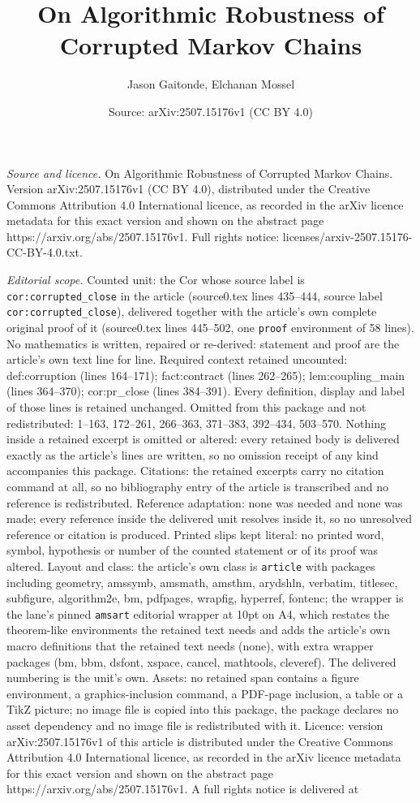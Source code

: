 \documentclass[10pt,a4paper]{amsart}
\title[On Algorithmic Robustness of Corrupted Markov Chains]{On Algorithmic Robustness of Corrupted Markov Chains}
\author{Jason Gaitonde, Elchanan Mossel}
\date{Source: arXiv:2507.15176v1 (CC BY 4.0)}
\begin{document}
\maketitle

\noindent\emph{Source and licence.} On Algorithmic Robustness of Corrupted Markov Chains. Version arXiv:2507.15176v1 (CC BY 4.0), distributed under the Creative Commons Attribution 4.0 International licence, as recorded in the arXiv licence metadata for this exact version and shown on the abstract page https://arxiv.org/abs/2507.15176v1. Full rights notice: licenses/arxiv-2507.15176-CC-BY-4.0.txt.\par\smallskip

\noindent\textit{Editorial scope.} Counted unit: the Cor whose source label is \texttt{cor:corrupted\_close} in the article (source0.tex lines 435--444, source label \texttt{cor:corrupted\_close}), delivered together with the article's own complete original proof of it (source0.tex lines 445--502, one \texttt{proof} environment of 58 lines). No mathematics is written, repaired or re-derived: statement and proof are the article's own text line for line. Required context retained uncounted: def:corruption (lines 164--171); fact:contract (lines 262--265); lem:coupling\_main (lines 364--370); cor:pr\_close (lines 384--391). Every definition, display and label of those lines is retained unchanged. Omitted from this package and not redistributed: 1--163, 172--261, 266--363, 371--383, 392--434, 503--570. Nothing inside a retained excerpt is omitted or altered: every retained body is delivered exactly as the article's lines are written, so no omission receipt of any kind accompanies this package. Citations: the retained excerpts carry no citation command at all, so no bibliography entry of the article is transcribed and no reference is redistributed. Reference adaptation: none was needed and none was made; every reference inside the delivered unit resolves inside it, so no unresolved reference or citation is produced. Printed slips kept literal: no printed word, symbol, hypothesis or number of the counted statement or of its proof was altered. Layout and class: the article's own class is \texttt{article} with packages including geometry, amssymb, amsmath, amsthm, arydshln, verbatim, titlesec, subfigure, algorithm2e, bm, pdfpages, wrapfig, hyperref, fontenc; the wrapper is the lane's pinned \texttt{amsart} editorial wrapper at 10pt on A4, which restates the theorem-like environments the retained text needs and adds the article's own macro definitions that the retained text needs (none), with extra wrapper packages (bm, bbm, dsfont, xspace, cancel, mathtools, cleveref). The delivered numbering is the unit's own. Assets: no retained span contains a figure environment, a graphics-inclusion command, a PDF-page inclusion, a table or a TikZ picture; no image file is copied into this package, the package declares no asset dependency and no image file is redistributed with it. Licence: version arXiv:2507.15176v1 of this article is distributed under the Creative Commons Attribution 4.0 International licence, as recorded in the arXiv licence metadata for this exact version and shown on the abstract page https://arxiv.org/abs/2507.15176v1. A full rights notice is delivered at 
\end{document}
